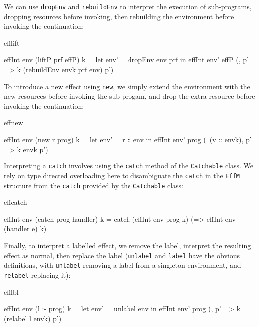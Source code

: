 \noindent
We can use \texttt{dropEnv} and \texttt{rebuildEnv} to interpret the execution
of sub-programs, dropping resources before invoking, then rebuilding the
environment before invoking the continuation:

\begin{SaveVerbatim}{efflift}

effInt env (liftP prf effP) k 
  = let env' = dropEnv env prf in 
        effInt env' effP (\envk, p' => 
              k (rebuildEnv envk prf env) p')

\end{SaveVerbatim}

\noindent
To introduce a new effect using \texttt{new}, we simply extend the environment
with the new resources before invoking the sub-progam, and drop the extra
resource before invoking the continuation:

\begin{SaveVerbatim}{effnew}

effInt env (new r prog) k 
     = let env' = r :: env in effInt env' prog 
               (\ (v :: envk), p' => k envk p')

\end{SaveVerbatim}

\noindent
Interpreting a \texttt{catch} involves using the \texttt{catch} method of
the \texttt{Catchable} class. We rely on type directed overloading here to
disambiguate the \texttt{catch} in the \texttt{EffM} structure from the
\texttt{catch} provided by the \texttt{Catchable} class:

\begin{SaveVerbatim}{effcatch}

effInt env (catch prog handler) k 
     = catch (effInt env prog k)
             (\e => effInt env (handler e) k)

\end{SaveVerbatim}

\noindent
Finally, to interpret a labelled effect, we remove the label, interpret the
resulting effect as normal, then replace the label (\texttt{unlabel} and
\texttt{label} have the obvious definitions, with \texttt{unlabel} removing
a label from a singleton environment, and \texttt{relabel} replacing it):

\begin{SaveVerbatim}{efflbl}

effInt env (l :- prog) k 
   = let env' = unlabel env in
         effInt env' prog (\envk, p' => 
                              k (relabel l envk) p')

\end{SaveVerbatim}

